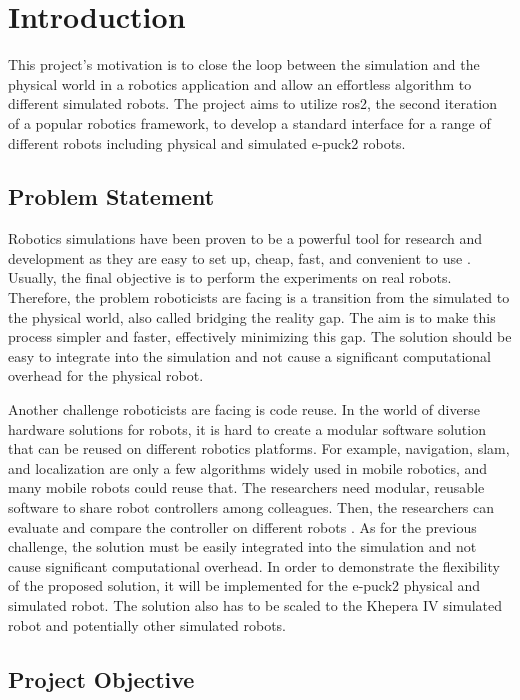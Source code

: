 \chapter{Introduction}
\label{chap:introduction}

This project's motivation is to close the loop between the simulation and the physical world in a robotics application and allow an effortless algorithm to different simulated robots.
The project aims to utilize \ac{ros2}, the second iteration of a popular robotics framework, to develop a standard interface for a range of different robots including physical and simulated e-puck2 robots.

\section{Problem Statement}
Robotics simulations have been proven to be a powerful tool for research and development as they are easy to set up, cheap, fast, and convenient to use \cite{michel_cyberbotics_2004}.
Usually, the final objective is to perform the experiments on real robots.
Therefore, the problem roboticists are facing is a transition from the simulated to the physical world, also called bridging the reality gap.
The aim is to make this process simpler and faster, effectively minimizing this gap. 
The solution should be easy to integrate into the simulation and not cause a significant computational overhead for the physical robot.

Another challenge roboticists are facing is code reuse. 
In the world of diverse hardware solutions for robots, it is hard to create a modular software solution that can be reused on different robotics platforms.
For example, navigation, \ac{slam}, and localization are only a few algorithms widely used in mobile robotics, and many mobile robots could reuse that.
The researchers need modular, reusable software to share robot controllers among colleagues.
Then, the researchers can evaluate and compare the controller on different robots \cite{vaughan_really_2007}.
As for the previous challenge, the solution must be easily integrated into the simulation and not cause significant computational overhead.
In order to demonstrate the flexibility of the proposed solution, it will be implemented for the e-puck2 physical and simulated robot.
The solution also has to be scaled to the Khepera IV simulated robot and potentially other simulated robots.

\section{Project Objective}

